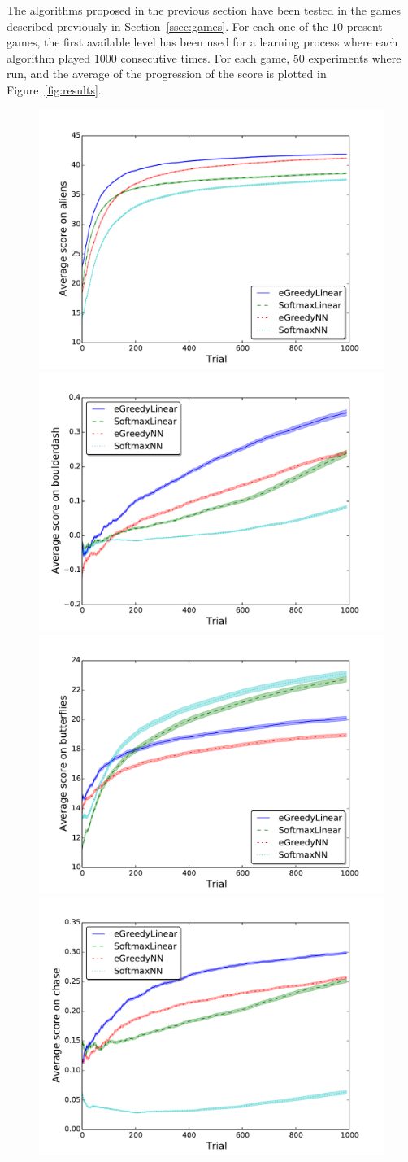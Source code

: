 \documentclass[conference]{IEEEtran}
\begin{document}
The algorithms proposed in the previous section have been tested in the games described previously in Section~\ref{ssec:games}. For each one of the $10$ present games, the first available level has been used for a learning process where each algorithm played $1000$ consecutive times. For each game, $50$ experiments where run, and the average of the progression of the score is plotted in Figure~\ref{fig:results}. 

\begin{figure}[ht]
	\begin{center}
	\includegraphics[width = .36\textwidth]{img/aliens_scores}
	\includegraphics[width = .36\textwidth]{img/boulderdash_scores}\\
	\vspace{-3.5mm}
	\includegraphics[width = .36\textwidth]{img/butterflies_scores}
	\includegraphics[width = .36\textwidth]{img/chase_scores}\\


\end{center}
\end{figure}
\end{document}
